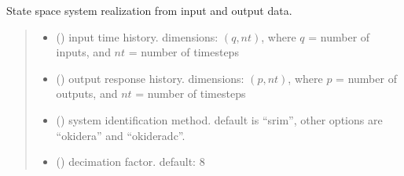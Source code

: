 \documentclass[letterpaper,10pt,english]{sphinxmanual}
\begin{document}
\begin{fulllineitems}
\label{\detokenize{library/index:mdof.impulse}}
\pysigstartsignatures
{}
\pysigstopsignatures
\end{fulllineitems}


\begin{fulllineitems}
\label{\detokenize{library/index:mdof.sysid}}
\pysigstartsignatures
{}
\pysigstopsignatures
\sphinxAtStartPar
State space system realization from input and output data.
\begin{quote}\begin{description}
\begin{itemize}
\item {} 
\sphinxAtStartPar
{} () \textendash{} input time history. dimensions: \((q,nt)\), where
\(q\) = number of inputs, and \(nt\) = number of timesteps

\item {} 
\sphinxAtStartPar
{} () \textendash{} output response history.
dimensions: \((p,nt)\), where \(p\) = number of outputs, and
\(nt\) = number of timesteps

\item {} 
\sphinxAtStartPar
{} (\sphinxstyleliteralemphasis{\sphinxupquote{, }}) \textendash{} system identification method. default is “srim”, other options are “okid\sphinxhyphen{}era” and “okid\sphinxhyphen{}era\sphinxhyphen{}dc”.

\item {} 
\sphinxAtStartPar
{} (\sphinxstyleliteralemphasis{\sphinxupquote{, }}) \textendash{} decimation factor. default: 8


\end{itemize}
\end{description}
\end{quote}
\end{fulllineitems}
\end{document}
